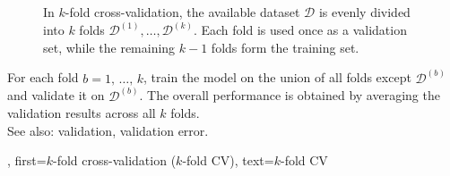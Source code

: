 {{{\begin{figure}[htbp]
	\caption{In $k$-fold cross-validation, the available dataset $\mathcal{D}$ is 
	evenly divided into $k$ folds $\mathcal{D}^{(1)},\ldots,\mathcal{D}^{(k)}$. Each fold is used once as a 
	validation set, while the remaining $k-1$ folds form the training set.		
	\label{fig_kfoldcv_dict}}
	\end{figure} 
	For each fold $b = 1, \,\ldots, \,k$, train the model on the 
	union of all folds except $\mathcal{D}^{(b)}$ and validate it on 
	$\mathcal{D}^{(b)}$. The overall performance is obtained by averaging 
	the validation results across all $k$ folds.
	\\ 
	See also: validation, validation error.},
	first={$k$-fold cross-validation ($k$-fold CV)},
	text={$k$-fold CV} 
}

}
